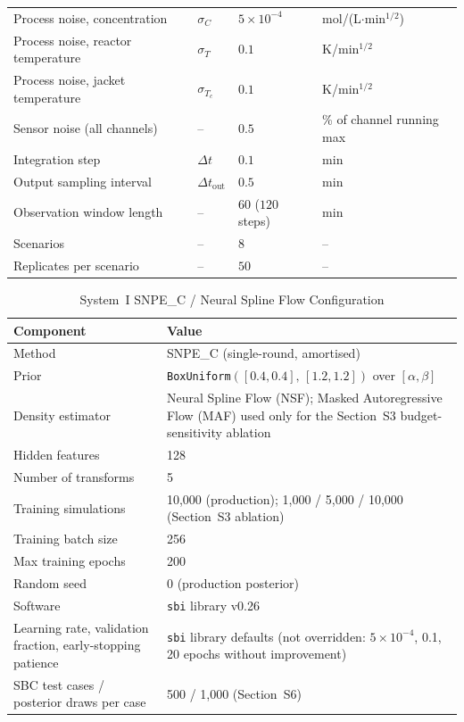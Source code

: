 \documentclass[aps,pre,twocolumn,superscriptaddress]{revtex4-2}
\begin{document}
\begin{table}[htbp]
\begin{tabular}{llll}
Process noise, concentration & $\sigma_C$ & $5\times10^{-4}$ & mol/(L$\cdot$min$^{1/2}$) \\
Process noise, reactor temperature & $\sigma_T$ & $0.1$ & K/min$^{1/2}$ \\
Process noise, jacket temperature & $\sigma_{T_c}$ & $0.1$ & K/min$^{1/2}$ \\
Sensor noise (all channels) & -- & $0.5$ & \% of channel running max \\
Integration step & $\Delta t$ & $0.1$ & min \\
Output sampling interval & $\Delta t_\mathrm{out}$ & $0.5$ & min \\
Observation window length & -- & $60$ ($120$ steps) & min \\
Scenarios & -- & $8$ & -- \\
Replicates per scenario & -- & $50$ & -- \\
\hline
\end{tabular}
\end{table}

\begin{table}[htbp]
\centering
\caption{System~I SNPE\_C / Neural Spline Flow Configuration}
\label{tab:si_system1_sbi}
\small
\begin{tabular}{lp{5.2cm}}
\hline
\textbf{Component} & \textbf{Value} \\
\hline
Method & SNPE\_C (single-round, amortised) \\
Prior & \texttt{BoxUniform}$([0.4,0.4],\,[1.2,1.2])$ over $[\alpha,\beta]$ \\
Density estimator & Neural Spline Flow (NSF); Masked Autoregressive Flow (MAF) used only for the Section~S3 budget-sensitivity ablation \\
Hidden features & 128 \\
Number of transforms & 5 \\
Training simulations & 10,000 (production); 1,000 / 5,000 / 10,000 (Section~S3 ablation) \\
Training batch size & 256 \\
Max training epochs & 200 \\
Random seed & 0 (production posterior) \\
Software & \texttt{sbi} library v0.26 \\
Learning rate, validation fraction, early-stopping patience & \texttt{sbi} library defaults (not overridden: $5\times10^{-4}$, 0.1, 20 epochs without improvement) \\
SBC test cases / posterior draws per case & 500 / 1,000 (Section~S6) \\
\hline
\end{tabular}
\end{table}
\end{document}
